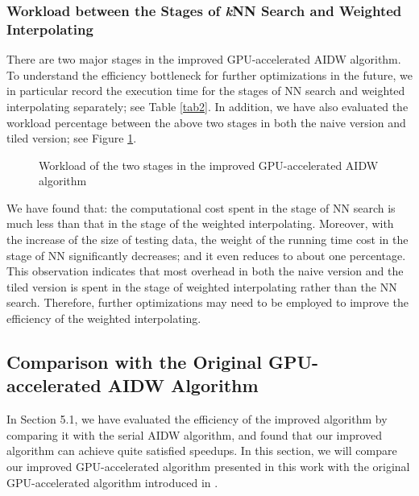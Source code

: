 \documentclass[final,5p,times,twocolumn,authoryear]{elsarticle}
\begin{document}
			\subsubsection{Workload between the Stages of \textit{k}NN Search and Weighted Interpolating}
			
			There are two major stages in the improved GPU-accelerated AIDW algorithm. 
			To understand the efficiency bottleneck for further optimizations in the 
			future, we in particular record the execution time for the stages of NN 
			search and weighted interpolating separately; see Table \ref{tab2}. In addition, we 
			have also evaluated the workload percentage between the above two stages in 
			both the naive version and tiled version; see Figure \ref{fig7}.
			
\begin{figure}[h!]
				\centering
				\hspace{1em}
				\caption{ Workload of the two stages in the improved GPU-accelerated 
					AIDW algorithm}
				\label{fig7}       \end{figure}
			

			We have found that: the computational cost spent in the stage of NN search 
			is much less than that in the stage of the weighted interpolating. Moreover, 
			with the increase of the size of testing data, the weight of the running 
			time cost in the stage of NN significantly decreases; and it even reduces to 
			about one percentage. This observation indicates that most overhead in both 
			the naive version and the tiled version is spent in the stage of weighted 
			interpolating rather than the NN search. Therefore, further optimizations 
			may need to be employed to improve the efficiency of the weighted 
			interpolating. 
			
			\subsection{Comparison with the Original GPU-accelerated AIDW Algorithm}
			In Section 5.1, we have evaluated the efficiency of the improved algorithm 
			by comparing it with the serial AIDW algorithm, and found that our improved 
			algorithm can achieve quite satisfied speedups. In this section, we will 
			compare our improved GPU-accelerated algorithm presented in this work with 
			the original GPU-accelerated algorithm introduced in \citep{29DBLP:journals/corr/MeiXX15}.
			
\end{document}
